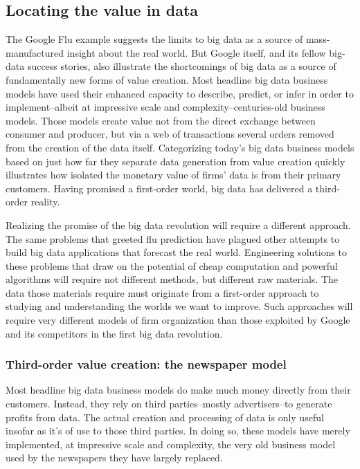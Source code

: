 \documentclass[12pt]{article}
\begin{document}
\subsection{Locating the value in data}
\label{sec:locating-value-data}


The Google Flu example suggests the limits to big data as a source of
mass-manufactured insight about the real world. But Google itself, and
its fellow big-data success stories, also illustrate the shortcomings
of big data as a source of fundamentally new forms of value creation. Most
headline big data business models have used their enhanced capacity to
describe, predict, or infer in order to implement--albeit at
impressive scale and complexity--centuries-old business models. Those
models create value not from the direct exchange between consumer and
producer, but via a web of transactions several orders removed from
the creation of the data itself. Categorizing today's big data
business models based on just how far they separate data generation
from value creation quickly illustrates how isolated the monetary
value of firms' data is from their primary customers. Having promised
a first-order world, big data has delivered a third-order
reality. 

Realizing the promise of the big data revolution will require
a different approach. The same problems that greeted flu prediction
have plagued other attempts to build big data applications that
forecast the real world. Engineering solutions to these problems that
draw on the potential of cheap computation and powerful algorithms
will require not different methods, but different raw materials. The
data those materials require must originate from a first-order
approach to studying and understanding the worlds we want to
improve. Such approaches will require very different models of firm
organization than those exploited by Google and its competitors in the
first big data revolution.


\subsubsection{Third-order value creation: the newspaper model}
\label{sec:third-order-value}

Most headline big data business models do make much money directly from
their customers. Instead, they rely on third parties--mostly
advertisers--to generate profits from data. The actual creation and
processing of data is only useful insofar as it's of use to those
third parties. In doing so, these models have merely implemented, at
impressive scale and complexity, the very old business model used by
the newspapers they have largely replaced.
\end{document}
